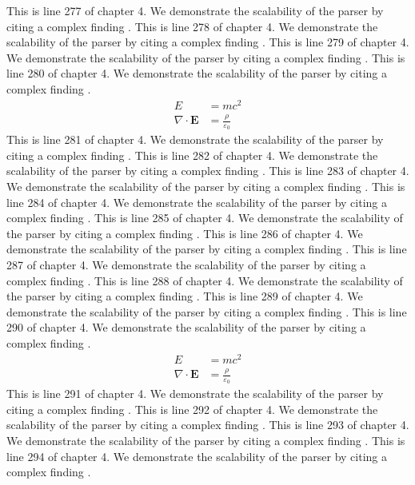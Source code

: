 This is line 277 of chapter 4. We demonstrate the scalability of the parser by citing a complex finding \cite{ref4_277}.
This is line 278 of chapter 4. We demonstrate the scalability of the parser by citing a complex finding \cite{ref4_278}.
This is line 279 of chapter 4. We demonstrate the scalability of the parser by citing a complex finding \cite{ref4_279}.
This is line 280 of chapter 4. We demonstrate the scalability of the parser by citing a complex finding \cite{ref4_280}.
\begin{align*}
  E &= mc^2 \\
  \nabla \cdot \mathbf{E} &= \frac{\rho}{\varepsilon_0}
\end{align*}
This is line 281 of chapter 4. We demonstrate the scalability of the parser by citing a complex finding \cite{ref4_281}.
This is line 282 of chapter 4. We demonstrate the scalability of the parser by citing a complex finding \cite{ref4_282}.
This is line 283 of chapter 4. We demonstrate the scalability of the parser by citing a complex finding \cite{ref4_283}.
This is line 284 of chapter 4. We demonstrate the scalability of the parser by citing a complex finding \cite{ref4_284}.
This is line 285 of chapter 4. We demonstrate the scalability of the parser by citing a complex finding \cite{ref4_285}.
This is line 286 of chapter 4. We demonstrate the scalability of the parser by citing a complex finding \cite{ref4_286}.
This is line 287 of chapter 4. We demonstrate the scalability of the parser by citing a complex finding \cite{ref4_287}.
This is line 288 of chapter 4. We demonstrate the scalability of the parser by citing a complex finding \cite{ref4_288}.
This is line 289 of chapter 4. We demonstrate the scalability of the parser by citing a complex finding \cite{ref4_289}.
This is line 290 of chapter 4. We demonstrate the scalability of the parser by citing a complex finding \cite{ref4_290}.
\begin{align*}
  E &= mc^2 \\
  \nabla \cdot \mathbf{E} &= \frac{\rho}{\varepsilon_0}
\end{align*}
This is line 291 of chapter 4. We demonstrate the scalability of the parser by citing a complex finding \cite{ref4_291}.
This is line 292 of chapter 4. We demonstrate the scalability of the parser by citing a complex finding \cite{ref4_292}.
This is line 293 of chapter 4. We demonstrate the scalability of the parser by citing a complex finding \cite{ref4_293}.
This is line 294 of chapter 4. We demonstrate the scalability of the parser by citing a complex finding \cite{ref4_294}.
